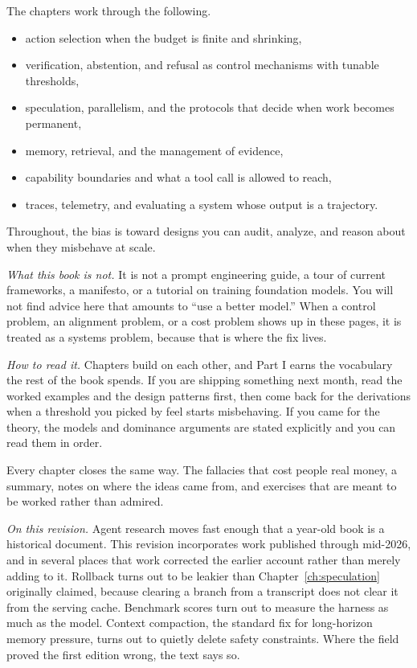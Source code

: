 \documentclass[11pt]{book}
\begin{document}
The chapters work through the following.
\begin{itemize}
\item action selection when the budget is finite and shrinking,
\item verification, abstention, and refusal as control mechanisms with tunable thresholds,
\item speculation, parallelism, and the protocols that decide when work becomes permanent,
\item memory, retrieval, and the management of evidence,
\item capability boundaries and what a tool call is allowed to reach,
\item traces, telemetry, and evaluating a system whose output is a trajectory.
\end{itemize}

Throughout, the bias is toward designs you can audit, analyze, and reason about
when they misbehave at scale.

\vspace{0.5em}
\noindent
\textit{What this book is not.}
It is not a prompt engineering guide, a tour of current frameworks, a
manifesto, or a tutorial on training foundation models. You will not find
advice here that amounts to ``use a better model.'' When a control problem,
an alignment problem, or a cost problem shows up in these pages, it is treated
as a systems problem, because that is where the fix lives.

\vspace{0.5em}
\noindent
\textit{How to read it.}
Chapters build on each other, and Part I earns the vocabulary the rest of the
book spends. If you are shipping something next month, read the worked examples
and the design patterns first, then come back for the derivations when a
threshold you picked by feel starts misbehaving. If you came for the theory,
the models and dominance arguments are stated explicitly and you can read them
in order.

Every chapter closes the same way. The fallacies that cost people real money,
a summary, notes on where the ideas came from, and exercises that are meant to
be worked rather than admired.

\vspace{0.5em}
\noindent
\textit{On this revision.}
Agent research moves fast enough that a year-old book is a historical document.
This revision incorporates work published through mid-2026, and in several
places that work corrected the earlier account rather than merely adding to it.
Rollback turns out to be leakier than Chapter~\ref{ch:speculation} originally
claimed, because clearing a branch from a transcript does not clear it from the
serving cache. Benchmark scores turn out to measure the harness as much as the
model. Context compaction, the standard fix for long-horizon memory pressure,
turns out to quietly delete safety constraints. Where the field proved the
first edition wrong, the text says so.
\end{document}
